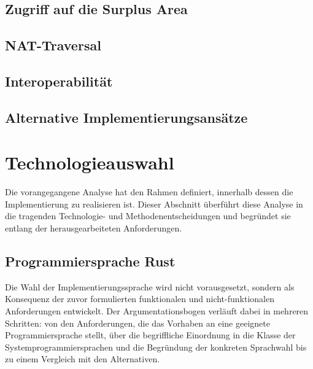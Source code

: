 \subsection{Zugriff auf die Surplus Area}
\label{subsec:surplus-zugriff}

\subsection{NAT-Traversal}
\label{subsec:nat-traversal}

\subsection{Interoperabilität}
\label{subsec:interoperabilitaet}

\subsection{Alternative Implementierungsansätze}
\label{subsec:alternativen}

\section{Technologieauswahl}
\label{sec:technologieauswahl}

Die vorangegangene Analyse hat den Rahmen definiert, innerhalb dessen die Implementierung
zu realisieren ist. Dieser Abschnitt überführt diese Analyse in die tragenden Technologie-
und Methodenentscheidungen und begründet sie entlang der herausgearbeiteten Anforderungen.

\subsection{Programmiersprache Rust}
\label{subsec:rust}

Die Wahl der Implementierungssprache wird nicht vorausgesetzt, sondern als Konsequenz der zuvor
formulierten funktionalen und nicht-funktionalen Anforderungen entwickelt. Der Argumentationsbogen
verläuft dabei in mehreren Schritten: von den Anforderungen, die das Vorhaben an eine geeignete
Programmiersprache stellt, über die begriffliche Einordnung in die Klasse der Systemprogrammiersprachen
und die Begründung der konkreten Sprachwahl bis zu einem Vergleich mit den Alternativen.

